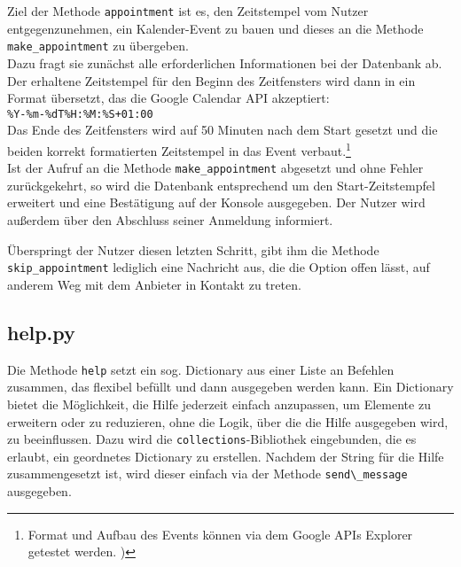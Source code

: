                 Ziel der Methode \verb|appointment| ist es, den Zeitstempel vom Nutzer entgegenzunehmen, ein Kalender-Event zu bauen und dieses an die Methode \verb|make_appointment| zu übergeben. \\
                Dazu fragt sie zunächst alle erforderlichen Informationen bei der Datenbank ab. Der erhaltene Zeitstempel für den Beginn des Zeitfensters wird dann in ein Format übersetzt, das die Google Calendar API akzeptiert: \\ 
                \verb/%Y-%m-%dT%H:%M:%S+01:00/ \\
                Das Ende des Zeitfensters wird auf 50 Minuten nach dem Start gesetzt und die beiden korrekt formatierten Zeitstempel in das Event verbaut.\footnote{Format und Aufbau des Events können via dem Google APIs Explorer getestet werden. \cite{apiExplorer})} \\
                Ist der Aufruf an die Methode \verb|make_appointment| abgesetzt und ohne Fehler zurückgekehrt, so wird die Datenbank entsprechend um den Start-Zeitstempfel erweitert und eine Bestätigung auf der Konsole ausgegeben. Der Nutzer wird außerdem über den Abschluss seiner Anmeldung informiert. 

                Überspringt der Nutzer diesen letzten Schritt, gibt ihm die Methode \verb|skip_appointment| lediglich eine Nachricht aus, die die Option offen lässt, auf anderem Weg mit dem Anbieter in Kontakt zu treten.

        
        \subsection{help.py} \label{help.py}
                Die Methode \verb|help| setzt ein sog. Dictionary aus einer Liste an Befehlen zusammen, das flexibel befüllt und dann ausgegeben werden kann. Ein Dictionary bietet die Möglichkeit, die Hilfe jederzeit einfach anzupassen, um Elemente zu erweitern oder zu reduzieren, ohne die Logik, über die die Hilfe ausgegeben wird, zu beeinflussen. Dazu wird die \verb|collections|-Bibliothek eingebunden, die es erlaubt, ein geordnetes Dictionary zu erstellen. Nachdem der String für die Hilfe zusammengesetzt ist, wird dieser einfach via der Methode \verb|send\_message| ausgegeben.



